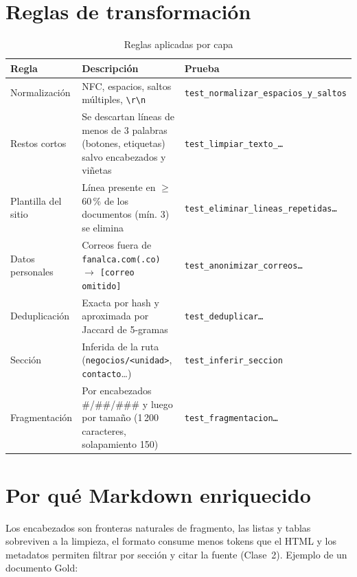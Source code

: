\section{Reglas de transformación}
\begin{table}[H]\centering\small
\caption{Reglas aplicadas por capa}\label{tab:reglas}
\begin{tabularx}{\linewidth}{@{}l X l@{}}\toprule
Regla & Descripción & Prueba\\\midrule
Normalización & NFC, espacios, saltos múltiples, \texttt{\textbackslash r\textbackslash n} & \texttt{test\_normalizar\_espacios\_y\_saltos}\\
Restos cortos & Se descartan líneas de menos de 3 palabras (botones, etiquetas) salvo encabezados y viñetas & \texttt{test\_limpiar\_texto\_\ldots}\\
Plantilla del sitio & Línea presente en $\geq$ 60\,\% de los documentos (mín. 3) se elimina & \texttt{test\_eliminar\_lineas\_repetidas\ldots}\\
Datos personales & Correos fuera de \texttt{fanalca.com(.co)} $\rightarrow$ \texttt{[correo omitido]} & \texttt{test\_anonimizar\_correos\ldots}\\
Deduplicación & Exacta por hash y aproximada por Jaccard de 5-gramas & \texttt{test\_deduplicar\ldots}\\
Sección & Inferida de la ruta (\texttt{negocios/<unidad>}, \texttt{contacto}\ldots) & \texttt{test\_inferir\_seccion}\\
Fragmentación & Por encabezados \#/\#\#/\#\#\# y luego por tamaño (1\,200 caracteres, solapamiento 150) & \texttt{test\_fragmentacion\ldots}\\\bottomrule
\end{tabularx}
\end{table}

\section{Por qué Markdown enriquecido}
Los encabezados son fronteras naturales de fragmento, las listas y tablas sobreviven a la limpieza, el formato
consume menos tokens que el HTML y los metadatos permiten filtrar por sección y citar la fuente (Clase~2). Ejemplo
de un documento Gold:

